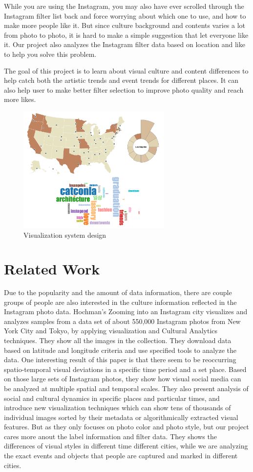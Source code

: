 \documentclass[conference]{acmsiggraph}
\begin{document}
While you are using the Instagram, you may also have ever scrolled through the Instagram filter list back and force worrying about which one to use, and how to make more people like it. But since culture background and contents varies a lot from photo to photo, it is hard to make a simple suggestion that let everyone like it. Our project also analyzes the Instagram filter data based on location and like to help you solve this problem.

The goal of this project is to learn about visual culture and content differences to help catch both the artistic trends and event trends for different places. It can also help user to make better filter selection to improve photo quality and reach more likes.   

\begin{figure}[ht]
  \centering
\includegraphics[width=3in]{images/vis}
  \caption{Visualization system design}
  \label{like-filter}
\end{figure}

\section{Related Work}

Due to the popularity and the amount of data information, there are couple groups of people are also interested in the culture information reflected in the Instagram photo data. Hochman's Zooming into an Instagram city \cite{hochman13} \cite{hochman12} visualizes and analyzes samples from a data set of about 550,000 Instagram photos from New York City and Tokyo, by applying visualization and Cultural Analytics techniques. They show all the images in the collection. They download data based on latitude and longitude criteria and use specified tools to analyze the data. One interesting result of this paper is that there seem to be reoccurring spatio-temporal visual deviations in a specific time period and a set place. Based on those large sets of Instagram photos, they show how visual social media can be analyzed at multiple spatial and temporal scales. They also present analysis of social and cultural dynamics in specific places and particular times, and introduce new visualization techniques which can show tens of thousands of individual images sorted by their metadata or algorithmically extracted visual features. But as they only focuses on photo color and photo style, but our project cares more anout the label information and filter data. They shows the differences of visual styles in different time different cities, while we are analyzing the exact events and objects that people are captured and marked in different cities.
\end{document}
